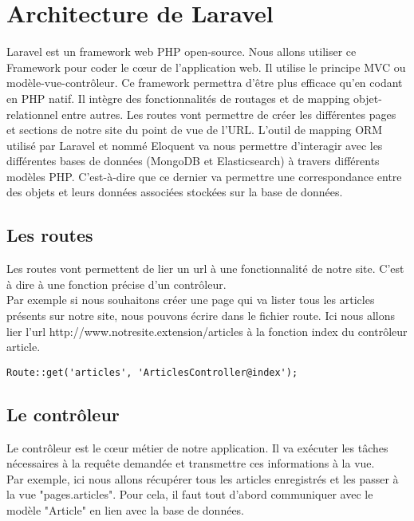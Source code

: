 \section{Architecture de Laravel}
\label{sec:laravel}

Laravel est un framework web PHP open-source. Nous allons utiliser ce Framework pour coder le cœur de l'application web. Il utilise le principe MVC ou modèle-vue-contrôleur. Ce framework permettra d'être plus efficace qu'en codant en PHP natif. Il intègre des fonctionnalités de routages et de mapping objet-relationnel entre autres. Les routes vont permettre de créer les différentes pages et sections de notre site du point de vue de l'URL. L'outil de mapping ORM utilisé par Laravel et nommé Eloquent va nous permettre d'interagir avec les différentes bases de données (MongoDB et Elasticsearch) à travers différents modèles PHP. C'est-à-dire que ce dernier va permettre une correspondance entre des objets et leurs données associées stockées sur la base de données.

\subsection{Les routes}

Les routes vont permettent de lier un url à une fonctionnalité de notre site. C'est à dire à une fonction précise d'un contrôleur.\\
Par exemple si nous souhaitons créer une page qui va lister tous les articles présents sur notre site, nous pouvons écrire dans le fichier route. Ici nous allons lier l'url http://www.notresite.extension/articles à la fonction index du contrôleur article.

\begin{verbatim}
Route::get('articles', 'ArticlesController@index');
\end{verbatim}

\subsection{Le contrôleur}

Le contrôleur est le cœur métier de notre application. Il va exécuter les tâches nécessaires à la requête demandée et transmettre ces informations à la vue.\\
Par exemple, ici nous allons récupérer tous les articles enregistrés et les passer à la vue "pages.articles". Pour cela, il faut tout d'abord communiquer avec le modèle "Article" en lien avec la base de données.

